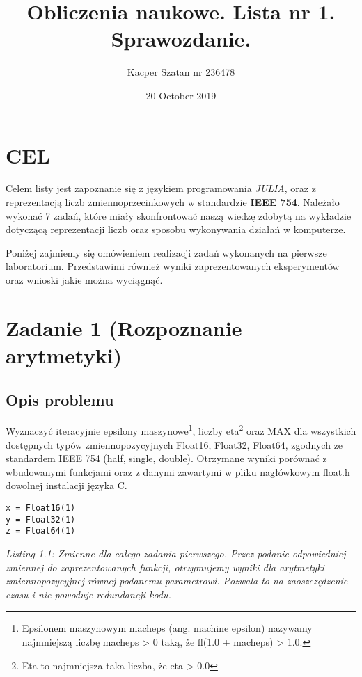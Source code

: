 \documentclass[]{article}
\title{Obliczenia naukowe. Lista nr 1. Sprawozdanie.}
\author{Kacper Szatan nr 236478}
\begin{document}
\date{20 October 2019}
\maketitle

\section*{\centering CEL}
Celem listy jest zapoznanie się z językiem programowania \textit{JULIA}, oraz z reprezentacją liczb zmiennoprzecinkowych w standardzie \textbf{IEEE 754}. Należało wykonać 7 zadań, które miały skonfrontować naszą wiedzę zdobytą na wykładzie dotyczącą reprezentacji liczb oraz sposobu wykonywania działań w komputerze.

Poniżej zajmiemy się omówieniem realizacji zadań wykonanych na pierwsze laboratorium. Przedstawimi również wyniki zaprezentowanych eksperymentów oraz wnioski jakie można wyciągnąć.   
\section{Zadanie 1 (Rozpoznanie arytmetyki)}
\subsection{Opis problemu}
Wyznaczyć iteracyjnie epsilony maszynowe\footnote{Epsilonem maszynowym macheps (ang. machine epsilon) nazywamy najmniejszą liczbę macheps > 0 taką, że fl(1.0 + macheps) > 1.0.}, liczby eta\footnote{Eta to najmniejsza taka liczba, że eta > 0.0} oraz MAX dla wszystkich dostępnych typów zmiennopozycyjnych Float16, Float32, Float64, zgodnych ze standardem IEEE 754 (half, single, double). Otrzymane wyniki porównać z wbudowanymi funkcjami oraz z danymi zawartymi w pliku nagłówkowym float.h dowolnej instalacji języka C.
\begin{lstlisting}
x = Float16(1)
y = Float32(1)
z = Float64(1)
\end{lstlisting}
\textit{Listing 1.1: Zmienne dla całego zadania pierwszego. Przez podanie odpowiedniej zmiennej do zaprezentowanych funkcji, otrzymujemy wyniki dla arytmetyki zmiennopozycyjnej równej podanemu parametrowi. Pozwala to na zaoszczędzenie czasu i nie powoduje redundancji kodu.}
\newpage
\end{document}
